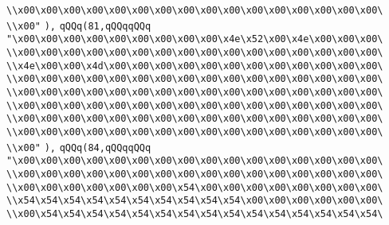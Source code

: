 \verb|\\x00\x00\x00\x00\x00\x00\x00\x00\x00\x00\x00\x00\x00\x00\x00\x00\|\newline
\verb|\\x00"|\newline
\verb|),|\newline
\verb|qQQq(81,qQQqqQQq|\newline
\verb|"\x00\x00\x00\x00\x00\x00\x00\x00\x00\x4e\x52\x00\x4e\x00\x00\x00\|\newline
\verb|\\x00\x00\x00\x00\x00\x00\x00\x00\x00\x00\x00\x00\x00\x00\x00\x00\|\newline
\verb|\\x4e\x00\x00\x4d\x00\x00\x00\x00\x00\x00\x00\x00\x00\x00\x00\x00\|\newline
\verb|\\x00\x00\x00\x00\x00\x00\x00\x00\x00\x00\x00\x00\x00\x00\x00\x00\|\newline
\verb|\\x00\x00\x00\x00\x00\x00\x00\x00\x00\x00\x00\x00\x00\x00\x00\x00\|\newline
\verb|\\x00\x00\x00\x00\x00\x00\x00\x00\x00\x00\x00\x00\x00\x00\x00\x00\|\newline
\verb|\\x00\x00\x00\x00\x00\x00\x00\x00\x00\x00\x00\x00\x00\x00\x00\x00\|\newline
\verb|\\x00\x00\x00\x00\x00\x00\x00\x00\x00\x00\x00\x00\x00\x00\x00\x00\|\newline
\verb|\\x00"|\newline
\verb|),|\newline
\verb|qQQq(84,qQQqqQQq|\newline
\verb|"\x00\x00\x00\x00\x00\x00\x00\x00\x00\x00\x00\x00\x00\x00\x00\x00\|\newline
\verb|\\x00\x00\x00\x00\x00\x00\x00\x00\x00\x00\x00\x00\x00\x00\x00\x00\|\newline
\verb|\\x00\x00\x00\x00\x00\x00\x00\x54\x00\x00\x00\x00\x00\x00\x00\x00\|\newline
\verb|\\x54\x54\x54\x54\x54\x54\x54\x54\x54\x54\x00\x00\x00\x00\x00\x00\|\newline
\verb|\\x00\x54\x54\x54\x54\x54\x54\x54\x54\x54\x54\x54\x54\x54\x54\x54\|\newline
